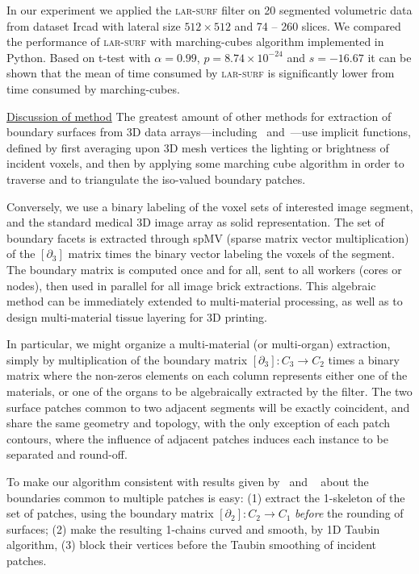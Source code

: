 \documentclass{article}
\begin{document}
In our experiment we applied the \textsc{lar-surf} filter on 20 segmented volumetric data from dataset Ircad \cite{ircad} with lateral size $512\times512$ and 74 -- 260 slices. We compared the performance of \textsc{lar-surf} with marching-cubes algorithm implemented in Python.
Based on t-test with $\alpha=0.99$, $p=8.74\times10^{-24}$ and 
$s=-16.67$ it can be shown that the mean of time consumed by \textsc{lar-surf} is significantly lower from time consumed by marching-cubes.


\vspace{0.8em}
\noindent\underline{Discussion of method}\vspace{0.2em}\newline
The greatest amount of other methods for extraction of boundary surfaces from 3D data arrays---including~\cite{10.1016/j.cad.2006.09.003} and~\cite{10.1115/1.2960489}---use implicit functions, defined by first averaging upon 3D mesh vertices the lighting or brightness of incident voxels, and then by applying some marching cube algorithm in order to traverse and to triangulate  the iso-valued boundary patches.  

Conversely, we use a binary labeling of the voxel sets of interested image segment, and the standard medical 3D image array as solid representation. The set of boundary facets is extracted through spMV (sparse matrix vector multiplication) of the $[\partial_3]$ matrix times the binary vector labeling the voxels of the segment. The boundary matrix is computed once and for all, sent to all workers (cores or nodes), then used in parallel for all image brick extractions. This algebraic method can be immediately extended to multi-material processing, as well as to design multi-material tissue layering for 3D printing.

In particular, we might organize a multi-material (or multi-organ) extraction, simply by multiplication of the boundary matrix $[\partial_3]: C_3\to C_2$  times a binary matrix where the non-zeros elements on each column represents either one of the materials, or one of the organs to be algebraically extracted by the filter. The two surface patches common to two adjacent segments will be exactly coincident, and share the same geometry and topology, with the only exception of each patch contours, where the influence of adjacent patches induces each instance to be separated and round-off.

To make our algorithm consistent with results given by~\cite{10.1016/j.cad.2006.09.003} and ~\cite{10.1115/1.2960489} about the boundaries common to multiple patches is easy: (1) extract the 1-skeleton of the set of patches, using the boundary matrix $[\partial_2]: C_2\to C_1$ \emph{before} the rounding of surfaces; (2) make the resulting 1-chains curved and smooth, by 1D Taubin algorithm, (3) block their vertices before the Taubin smoothing of incident patches.
\end{document}
